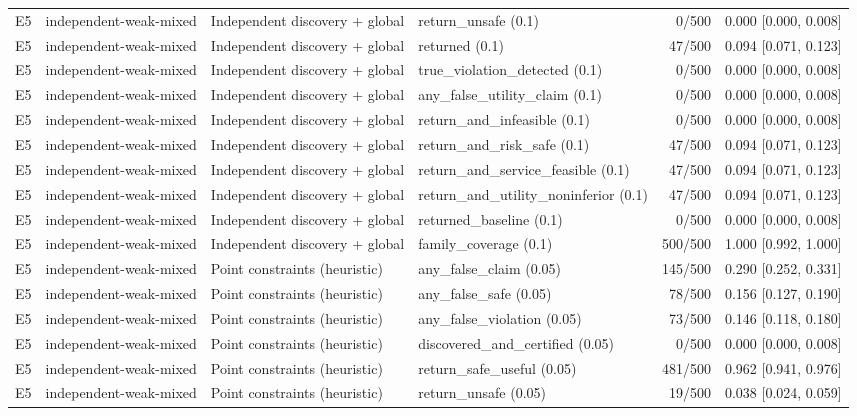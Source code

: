 \begin{longtable}{p{.04\linewidth}p{.18\linewidth}p{.19\linewidth}p{.16\linewidth}r p{.21\linewidth}}
E5 & independent-weak-mixed & Independent discovery + global & return\_unsafe (0.1) & 0/500 & 0.000 [0.000, 0.008]\\
E5 & independent-weak-mixed & Independent discovery + global & returned (0.1) & 47/500 & 0.094 [0.071, 0.123]\\
E5 & independent-weak-mixed & Independent discovery + global & true\_violation\_detected (0.1) & 0/500 & 0.000 [0.000, 0.008]\\
E5 & independent-weak-mixed & Independent discovery + global & any\_false\_utility\_claim (0.1) & 0/500 & 0.000 [0.000, 0.008]\\
E5 & independent-weak-mixed & Independent discovery + global & return\_and\_infeasible (0.1) & 0/500 & 0.000 [0.000, 0.008]\\
E5 & independent-weak-mixed & Independent discovery + global & return\_and\_risk\_safe (0.1) & 47/500 & 0.094 [0.071, 0.123]\\
E5 & independent-weak-mixed & Independent discovery + global & return\_and\_service\_feasible (0.1) & 47/500 & 0.094 [0.071, 0.123]\\
E5 & independent-weak-mixed & Independent discovery + global & return\_and\_utility\_noninferior (0.1) & 47/500 & 0.094 [0.071, 0.123]\\
E5 & independent-weak-mixed & Independent discovery + global & returned\_baseline (0.1) & 0/500 & 0.000 [0.000, 0.008]\\
E5 & independent-weak-mixed & Independent discovery + global & family\_coverage (0.1) & 500/500 & 1.000 [0.992, 1.000]\\
E5 & independent-weak-mixed & Point constraints (heuristic) & any\_false\_claim (0.05) & 145/500 & 0.290 [0.252, 0.331]\\
E5 & independent-weak-mixed & Point constraints (heuristic) & any\_false\_safe (0.05) & 78/500 & 0.156 [0.127, 0.190]\\
E5 & independent-weak-mixed & Point constraints (heuristic) & any\_false\_violation (0.05) & 73/500 & 0.146 [0.118, 0.180]\\
E5 & independent-weak-mixed & Point constraints (heuristic) & discovered\_and\_certified (0.05) & 0/500 & 0.000 [0.000, 0.008]\\
E5 & independent-weak-mixed & Point constraints (heuristic) & return\_safe\_useful (0.05) & 481/500 & 0.962 [0.941, 0.976]\\
E5 & independent-weak-mixed & Point constraints (heuristic) & return\_unsafe (0.05) & 19/500 & 0.038 [0.024, 0.059]\\

\end{longtable}
